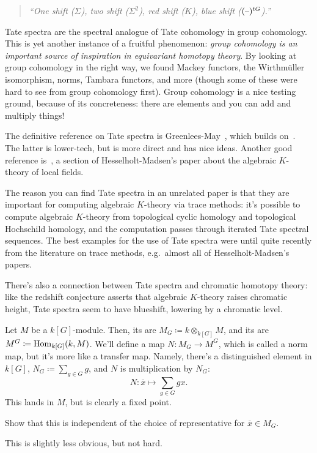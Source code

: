 \begin{quote}\textit{
	``One shift ($\Sigma$), two shift ($\Sigma^2$), red shift ($K$), blue shift ($(\text{--})^{tG}$).''
}\end{quote}
Tate spectra are the spectral analogue of Tate cohomology in group cohomology. This is yet another instance of a
fruitful phenomenon: \emph{group cohomology is an important source of inspiration in equivariant homotopy theory}.
By looking at group cohomology in the right way, we found Mackey functors, the Wirthmüller isomorphism, norms,
Tambara functors, and more (though some of these were hard to see from group cohomology first). Group cohomology is
a nice testing ground, because of its concreteness: there are elements and you can add and multiply things!
\begin{rem}
The definitive reference on Tate spectra is Greenlees-May~\cite{GeneralizedTate}, which builds on~\cite{ACD}. The
latter is lower-tech, but is more direct and has nice ideas. Another good reference is~\cite[\S 4]{HM03}, a section
of Hesselholt-Madsen's paper about the algebraic $K$-theory of local fields.

The reason you can find Tate spectra in an  unrelated paper is that they are important for
computing algebraic $K$-theory via trace methods: it's possible to compute algebraic $K$-theory from topological
cyclic homology and topological Hochschild homology, and the computation passes through iterated Tate spectral
sequences. The best examples for the use of Tate spectra were until quite recently from the literature on trace
methods, e.g.\ almost all of Hesselholt-Madsen's papers.

There's also a connection between Tate spectra and chromatic homotopy theory: like the redshift conjecture asserts
that algebraic $K$-theory raises chromatic height, Tate spectra seem to have blueshift, lowering by a chromatic
level.
\end{rem}
Let $M$ be a $k[G]$-module. Then, its  are $M_G\coloneqq k\otimes_{k[G]} M$, and its
 are $M^G\coloneqq\operatorname{Hom}_{k[G]}(k, M)$. We'll define a map $N\colon M_G\to M^G$, which
is called a norm map, but it's more like a transfer map. Namely, there's a distinguished element in $k[G]$,
$N_G\coloneqq \sum_{g\in G} g$, and $N$ is multiplication by $N_G$:
\[N\colon \overline x\mapsto\sum_{g\in G} gx.\]
This lands in $M$, but is clearly a fixed point.
\begin{ex}
Show that this is independent of the choice of representative for $\overline x\in M_G$.
\end{ex}
This is slightly less obvious, but not hard.

